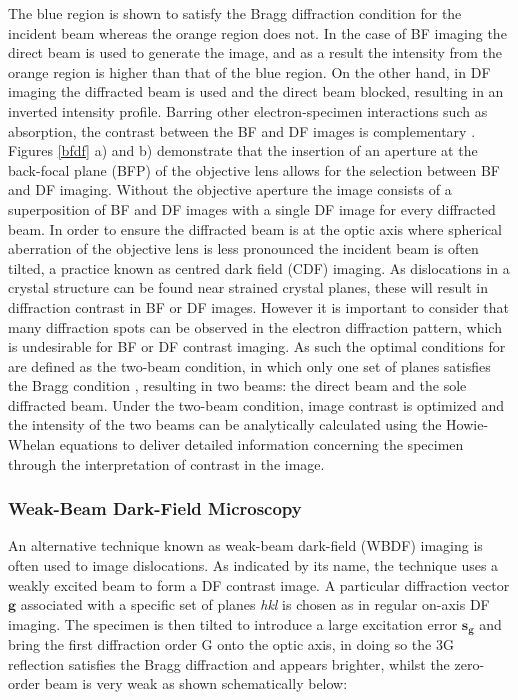 The blue region is shown to satisfy the Bragg diffraction condition for the incident beam whereas the orange region does not. In the case of BF imaging the direct beam is used to generate the image, and as a result the intensity from the orange region is higher than that of the blue region. On the other hand, in DF imaging the diffracted beam is used and the direct beam blocked, resulting in an inverted intensity profile. Barring other electron-specimen interactions such as absorption, the contrast between the BF and DF images is complementary \cite{DavidB.Williams2009}.\\
Figures \ref{bfdf} a) and b) demonstrate that the insertion of an aperture at the back-focal plane (BFP) of the objective lens allows for the selection between BF and DF imaging. Without the objective aperture the image consists of a superposition of BF and DF images with a single DF image for every diffracted beam. In order to ensure the diffracted beam is at the optic axis where spherical aberration of the objective lens is less pronounced the incident beam is often tilted, a practice known as centred dark field (CDF) imaging.
As dislocations in a crystal structure can be found near strained crystal planes, these will result in diffraction contrast in BF or DF images. However it is important to consider that many diffraction spots can be observed in the electron diffraction pattern, which is undesirable for BF or DF contrast imaging. As such the optimal conditions for are defined as the two-beam condition, in which only one set of planes satisfies the Bragg condition \cite{DavidB.Williams2009}, resulting in two beams: the direct beam and the sole diffracted beam. Under the two-beam condition, image contrast is optimized and the intensity of the two beams can be analytically calculated using the Howie-Whelan equations \cite{DavidB.Williams2009} to deliver detailed information concerning the specimen through the interpretation of contrast in the image.

\subsubsection{Weak-Beam Dark-Field Microscopy}

An alternative technique known as weak-beam dark-field (WBDF)  imaging is often used to image dislocations. As indicated by its name, the technique uses a weakly excited beam to form a DF contrast image. A particular diffraction vector $\mathbf{g}$ associated with a specific set of planes \textit{hkl} is chosen as in regular on-axis DF imaging. The specimen is then tilted to introduce a large excitation error $\mathbf{s_{g}}$ and bring the first diffraction order G onto the optic axis, in doing so the 3G reflection satisfies the Bragg diffraction and appears brighter, whilst the zero-order beam is very weak as shown schematically below:

